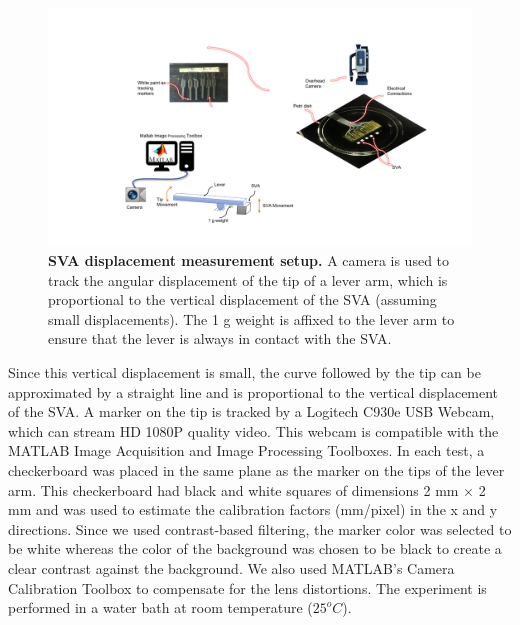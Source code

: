 \begin{figure}[!h]
      \centering
      \includegraphics[width=\textwidth]{swellingTestSetup.pdf}
      \caption[]{\textbf{SVA displacement measurement setup.} A camera is used to track the angular displacement of the tip of a lever arm, which is proportional to the vertical displacement of the SVA (assuming small displacements). The 1 g weight is affixed to the lever arm to ensure that the lever is always in contact with the SVA.}
      \label{fig:swellingTestSetup}
\end{figure}

Since this vertical displacement is small, the curve followed by the tip can be approximated by a straight line and is proportional to the vertical displacement of the SVA. A marker on the tip is tracked by a Logitech C930e USB Webcam, which can stream HD 1080P quality video. This webcam is compatible with the MATLAB Image Acquisition and Image Processing Toolboxes. In each test, a checkerboard was placed in the same plane as the marker on the tips of the lever arm. This checkerboard had black and white squares of dimensions 2 mm × 2 mm and was used to estimate the calibration factors (mm/pixel) in the x and y directions. Since we used contrast-based filtering, the marker color was selected to be white whereas the color of the background was chosen to be black to create a clear contrast against the background. We also used MATLAB’s Camera Calibration Toolbox to compensate for the lens distortions. The experiment is performed in a water bath at room temperature ($25^{o}C$).


